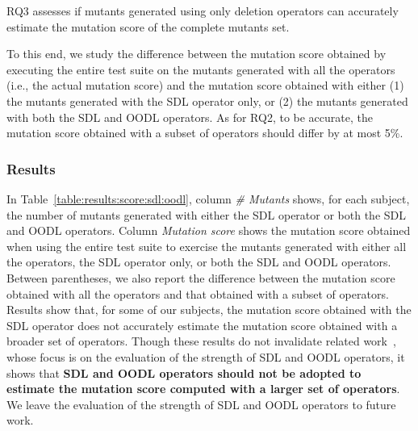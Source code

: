 RQ3 assesses if mutants generated using only deletion operators can accurately estimate the mutation score of the complete mutants set.

To this end, we study the difference between the mutation score obtained by executing the entire test suite on the mutants generated with all the operators (i.e., the actual mutation score) and the mutation score obtained with either (1) the mutants generated with the SDL operator only, or (2) the mutants generated with both the SDL and OODL operators.
As for RQ2, to be accurate, the mutation score obtained with a subset of operators should differ by at most 5\%.


\subsubsection{Results}



In Table~\ref{table:results:score:sdl:oodl}, column \emph{\# Mutants} shows, for each subject, the number of mutants generated with either the SDL operator or both the SDL and OODL operators. 
Column \emph{Mutation score} shows the mutation score obtained when using the entire test suite to exercise the mutants generated with either all the operators, the SDL operator only, or both the SDL and OODL operators. Between parentheses, we also report the difference between the mutation score obtained with all the operators and that obtained with a subset of operators. Results show that, for some of our subjects, the mutation score obtained with the SDL operator does not accurately estimate the mutation score obtained with a broader set of operators. Though these results do not invalidate related work~\cite{delamaro2014experimental}, whose focus is on the evaluation of the strength of SDL and OODL operators, it shows that \textbf{SDL and OODL operators should not be adopted to estimate the mutation score computed with a larger set of operators}. We leave the evaluation of the strength of SDL and OODL operators to future work.





%
%

